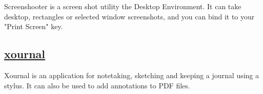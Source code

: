  Screenshooter is a screen shot utility the Desktop Environment. It can take
 desktop, rectangles or selected window screenshots, and you can bind it to
 your "Print Screen" key.

\subsection{\href{http://xournal.sourceforge.net/}{xournal}}

 Xournal is an application for notetaking, sketching and
 keeping a journal using a stylus. It can also be used to
 add annotations to PDF files.

